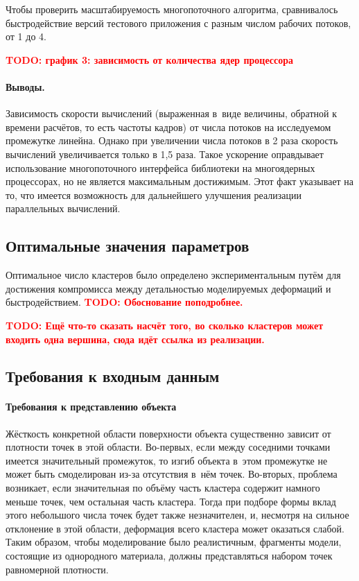 \documentclass[a4paper, 14pt, titlepage]{extarticle}
\newcommand{\todo}[1]{\textbf{\textcolor{red}{TODO: #1}}}
\begin{document}
        Чтобы проверить масштабируемость многопоточного алгоритма, сравнивалось быстродействие версий
        тестового приложения с разным числом рабочих потоков, от 1 до 4.

        \todo{график 3: зависимость от количества ядер процессора}

        \paragraph{Выводы.} Зависимость скорости вычислений (выраженная в~виде величины, обратной к
        времени расчётов, то есть частоты кадров) от числа потоков на исследуемом промежутке линейна. Однако
        при увеличении числа потоков в 2 раза скорость вычислений увеличивается только в 1,5 раза.
        Такое ускорение оправдывает использование многопоточного интерфейса библиотеки на многоядерных
        процессорах, но не является максимальным достижимым. Этот факт указывает на то, что имеется
        возможность для дальнейшего улучшения реализации параллельных вычислений.

    \subsection{Оптимальные значения параметров}\label{ssec:optimal_parameters}

      Оптимальное число кластеров было определено экспериментальным
      путём для достижения компромисса между детальностью моделируемых деформаций и быстродействием.
      \todo{Обоснование поподробнее.}

      \todo{Ещё что-то сказать насчёт того, во сколько кластеров может входить одна вершина, сюда
      идёт ссылка из реализации.}

    \subsection{Требования к входным данным}\label{ssec:requirements}

      \paragraph{Требования к представлению объекта}
      Жёсткость конкретной области поверхности объекта существенно зависит от плотности точек в этой
      области. Во-первых, если между соседними точками имеется значительный промежуток, то изгиб
      объекта в~этом промежутке не может быть смоделирован из-за отсутствия в~нём точек. Во-вторых,
      проблема возникает, если значительная по объёму часть кластера содержит намного меньше точек,
      чем остальная часть кластера. Тогда при подборе формы вклад этого небольшого числа точек будет
      также незначителен, и, несмотря на сильное отклонение в этой области, деформация всего
      кластера может оказаться слабой. Таким образом, чтобы моделирование было реалистичным,
      фрагменты модели, состоящие из однородного материала, должны представляться набором точек
      равномерной плотности.
\end{document}
